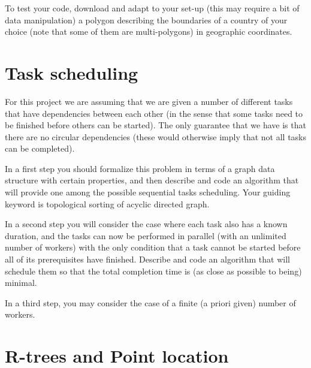 \documentclass[11pt]{article}
\begin{document}
To test your code, download and adapt to your set-up (this may require a bit of data
manipulation) a polygon describing the boundaries of a country of your choice
(note that some of them are multi-polygons) in geographic coordinates.

\section{Task scheduling}

For this project we are assuming that we are given a number of different tasks that have 
dependencies between each other (in the sense that some tasks need to be finished before others can
be started). The only guarantee that we have is that there are no circular dependencies (these
would otherwise imply that not all tasks can be completed).

In a first step you should formalize this problem in terms of a graph data structure with
certain properties, and then describe and code an algorithm that will provide one among the
possible sequential tasks scheduling. Your guiding keyword is topological sorting of acyclic
directed graph.

In a second step you will consider the case where each task also has a known duration, and
the tasks can now be performed in parallel (with an unlimited number of workers) with the only condition
that a task cannot be started before all of its prerequisites have finished. Describe and 
code an algorithm that will schedule them so that the total completion time is
(as close as possible to being) minimal.

In a third step, you may consider the case of a finite (a priori given) number
of workers.

\section{R-trees and Point location}

\medskip
\end{document}

